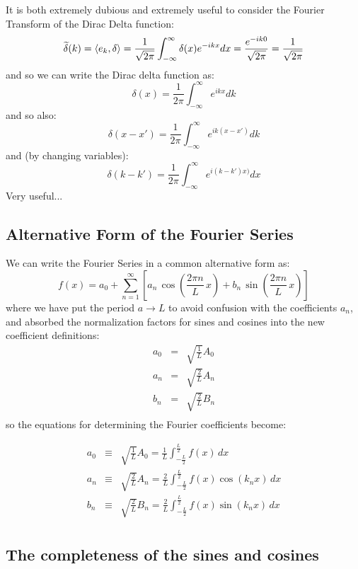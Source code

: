 \documentclass[12pt]{book}
\begin{document}
It is both extremely dubious and extremely useful to consider the Fourier Transform of the Dirac Delta function:
$$
\widetilde{\delta}(k) = \braket{e_k, \delta} = \frac{1}{\sqrt{2\pi}} \int_{-\infty}^{\infty} \delta(x) e^{-ikx} dx  = \frac{e^{-ik0}}{\sqrt{2\pi}} = \frac{1}{\sqrt{2\pi}} 
$$
and so we can write the Dirac delta function as:
$$
\delta(x) = \frac{1}{2\pi} \int_{-\infty}^{\infty} e^{ikx} dk
$$
and so also:
$$
\delta(x-x') = \frac{1}{2\pi} \int_{-\infty}^{\infty} e^{ik(x-x')} dk
$$
and (by changing variables):
$$
\delta(k-k') = \frac{1}{2\pi} \int_{-\infty}^{\infty} e^{i(k-k')x)} dx
$$
Very useful...

\subsection{Alternative Form of the Fourier Series}

We can write the Fourier Series in a common alternative form as:
\begin{equation}
f(x) = a_0 + \sum_{n=1}^{\infty}  \left[ a_n \, \cos\left(\frac{2\pi n}{L} \, x \right) + b_n \, \sin\left(\frac{2\pi n}{L} \, x \right) \right]\label{eqn:lfs}
\end{equation}
where we have put the period $a \to L$ to avoid confusion with the coefficients $a_n$, and absorbed the normalization factors for sines and cosines into the new coefficient definitions:
\begin{eqnarray*}
a_0 &=& \sqrt{\frac{1}{L}} A_0\\
a_n &=& \sqrt{\frac{2}{L}} A_n\\
b_n &=& \sqrt{\frac{2}{L}} B_n\\
\end{eqnarray*}
so the equations for determining the Fourier coefficients become:

\begin{eqnarray}
a_0 &\equiv& \sqrt{\frac{1}{L}}  A_0 = \frac{1}{L} \int_{-\frac{L}{2}}^{\frac{L}{2}} 
f(x) \, dx \\
a_n &\equiv& \sqrt{\frac{2}{L}}  A_n = \frac{2}{L} \int_{-\frac{L}{2}}^{\frac{L}{2}} 
f(x) \cos( k_n x) \, dx \\
b_n &\equiv& \sqrt{\frac{2}{L}}  B_n = \frac{2}{L} \int_{-\frac{L}{2}}^{\frac{L}{2}} 
f(x) \sin( k_n x) \, dx \\
\end{eqnarray}



\subsection{The completeness of the sines and cosines}
\end{document}
